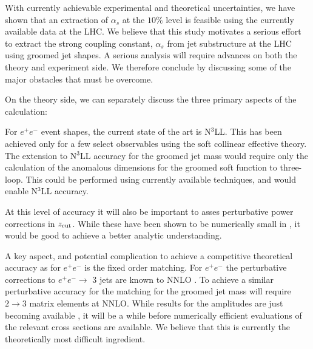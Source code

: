 \documentclass[11pt,letterpaper]{article}
\newcommand{\zcut}{z_{\rm cut}}
\newcommand{\ijm}[1]{\textbf{\textcolor{llblue}{(#1 --ijm)}}}
\begin{document}
With currently achievable experimental and theoretical uncertainties, we have shown that an extraction of $\alpha_s$ at the $10\%$ level is feasible using the currently available data at the LHC.  We believe that this study motivates a serious effort to extract the strong coupling constant, $\alpha_s$ from jet substructure at the LHC using groomed jet shapes. A serious analysis will require advances on both the theory and experiment side. We therefore conclude by discussing some of the major obstacles that must be overcome.



On the theory side, we can separately discuss the three primary aspects of the calculation:

\vspace{5mm}

 For $e^+e^-$ event shapes, the current state of the art is N$^3$LL. This has been achieved only for a few select observables using the soft collinear effective theory. The extension  to N$^3$LL accuracy for the groomed jet mass would require only the calculation of the anomalous dimensions for the groomed soft function to three-loop. This could be performed using currently available techniques, and would enable N$^3$LL accuracy. 

At this level of accuracy it will also be important to asses perturbative power corrections in $\zcut$. While these have been shown to be numerically small in \cite{Marzani:2017kqd,Marzani:2017mva}, it would be good to achieve a better analytic understanding. 

\vspace{5mm}

 A key aspect, and potential complication to achieve a competitive theoretical accuracy as for $e^+e^-$ is the fixed order matching. For $e^+e^-$  the perturbative corrections to $e^+e^- \to$ 3 jets are known to NNLO \cite{GehrmannDeRidder:2007hr,Gehrmann-DeRidder:2007nzq,Weinzierl:2008iv,Weinzierl:2009ms}. To achieve a similar perturbative accuracy for the matching for the groomed jet mass will require $2\to 3$ matrix elements at NNLO. While results for the amplitudes are just becoming available \cite{Gehrmann:2015bfy,Dunbar:2016aux,Badger:2013yda,Badger:2017jhb,Abreu:2017hqn}, it will be a while before numerically efficient evaluations of the relevant cross sections are available. We believe that this is currently the theoretically most difficult ingredient. 
\end{document}
